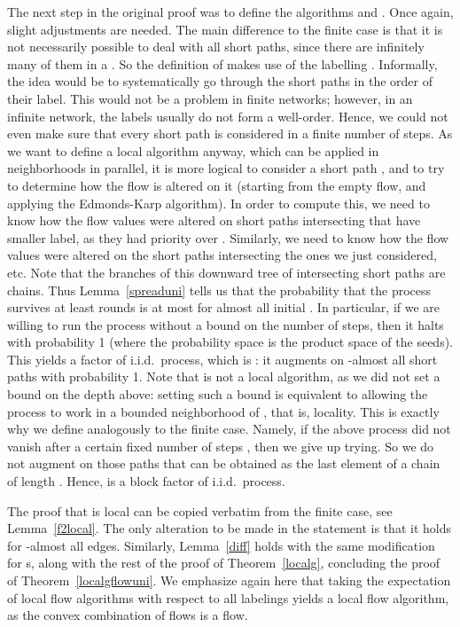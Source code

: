 \documentclass[12pt,a4paper]{article}
\renewcommand{\:}{\colon}
\begin{document}
The next step in the original proof was to define the algorithms  and . 
Once again, slight adjustments are needed. 
The main difference to the finite case is that it is not necessarily possible to deal with all short paths, since there are infinitely many of them in a . 
So the definition of  makes use of the labelling . 
Informally, the idea would be to systematically go through the short paths in the order of their label. 
This would not be a problem in finite networks; however, in an infinite network, the labels usually do not form a well-order. 
Hence, we could not even make sure that every short path is considered in a finite number of steps. 
As we want to define a local algorithm anyway, which can be applied in neighborhoods in parallel, it is more logical to consider a short path , and to try to determine how the flow is altered on it (starting from the empty flow, and applying the Edmonds-Karp algorithm). 
In order to compute this, we need to know how the flow values were altered on short paths intersecting  that have smaller label, as they had priority over . 
Similarly, we need to know how the flow values were altered on the short paths intersecting the ones we just considered, etc. 
Note that the branches of this downward tree of intersecting short paths are chains. 
Thus Lemma~\ref{spreaduni} tells us that the probability that the process survives at least  rounds is at most  for almost all initial . 
In particular, if we are willing to run the process without a bound on the number of steps, then it halts with probability 1 (where the probability space is the product space of the seeds). 
This yields a factor of i.i.d.\ process, which is : it augments on -almost all short paths with probability 1. 
Note that  is not a local algorithm, as we did not set a bound on the depth  above: setting such a bound is equivalent to allowing the process to work in a bounded neighborhood of , that is, locality. 
This is exactly why we define  analogously to the finite case. 
Namely, if the above process did not vanish after a certain fixed number of steps , then we give up trying. 
So we do not augment on those paths that can be obtained as the last element of a chain of length . 
Hence,  is a block factor of i.i.d.\ process. 

The proof that  is local can be copied verbatim from the finite case, see Lemma~\ref{f2local}. 
The only alteration to be made in the statement is that it holds for -almost all edges. 
Similarly, Lemma~\ref{diff} holds with the same modification for s, along with the rest of the proof of Theorem~\ref{localg}, concluding the proof of Theorem~\ref{localgflowuni}. 
We emphasize again here that taking the expectation of local flow algorithms with respect to all labelings yields a local flow algorithm, as the convex combination of flows is a flow. 
\end{document}
